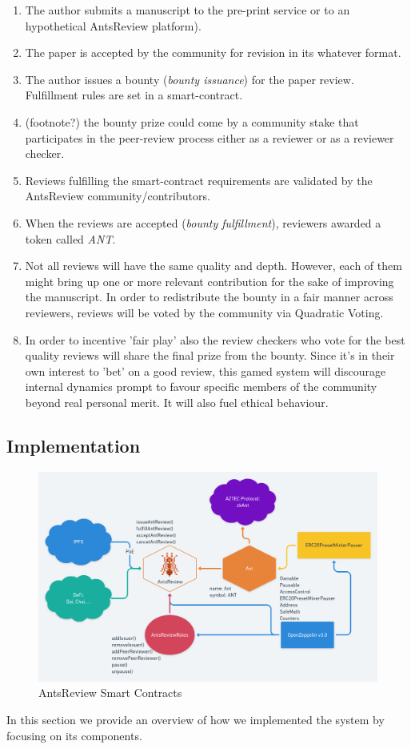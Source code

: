 \documentclass[runningheads]{llncs}
\begin{document}
\begin{enumerate}
    \item The author submits a manuscript to the pre-print service or to an hypothetical AntsReview platform).
    \item The paper is accepted by the community for revision in its whatever format.
    \item The author issues a bounty (\emph{bounty issuance}) for the paper review. Fulfillment rules are set in a smart-contract.
    \item (footnote?) the bounty prize could come by a community stake that participates in the peer-review process either as a reviewer or as a reviewer checker.
    \item Reviews fulfilling the smart-contract requirements are validated by the AntsReview community/contributors.
    \item When the reviews are accepted (\emph{bounty fulfillment}), reviewers awarded a token called \emph{ANT}.
    \item Not all reviews will have the same quality and depth. However, each of them might bring up one or more relevant contribution for the sake of improving the manuscript. In order to redistribute the bounty in a fair manner across reviewers, reviews will be voted by the community via Quadratic Voting.
    \item In order to incentive 'fair play' also the review checkers who vote for the best quality reviews will share the final prize from the bounty. Since it's in their own interest to 'bet' on a good review, this gamed system will discourage internal dynamics prompt to favour specific members of the community beyond real personal merit. It will also fuel ethical behaviour.

 \end{enumerate}

\subsection{Implementation}

\begin{figure}
\centering
\includegraphics[scale=0.28]{AntsReview}
\caption{AntsReview Smart Contracts}
\label{fig:contracts}
\end{figure}
In this section we provide an overview of how we implemented the system by focusing on its components.
\end{document}
